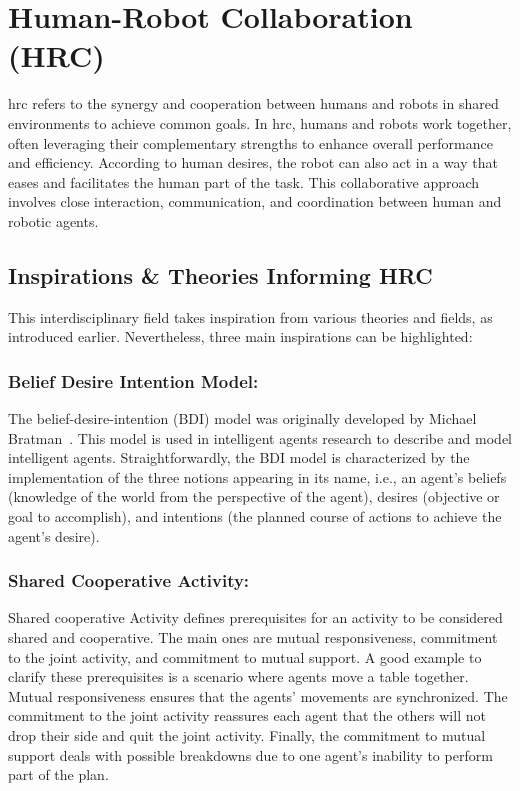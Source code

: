 \section{Human-Robot Collaboration (HRC)}

\acrfull{hrc} refers to the synergy and cooperation between humans and robots in shared environments to achieve common goals. In \acrshort{hrc}, humans and robots work together, often leveraging their complementary strengths to enhance overall performance and efficiency. According to human desires, the robot can also act in a way that eases and facilitates the human part of the task. This collaborative approach involves close interaction, communication, and coordination between human and robotic agents.

\subsection{Inspirations \& Theories Informing HRC}

This interdisciplinary field takes inspiration from various theories and fields, as introduced earlier. Nevertheless, three main inspirations can be highlighted:

\subsubsection*{Belief Desire Intention Model:} The belief-desire-intention (BDI) model was originally developed by Michael Bratman~\cite{Bratman1987_BRAIPA}. This model is used in intelligent agents research to describe and model intelligent agents. Straightforwardly, the BDI model is characterized by the implementation of the three notions appearing in its name, i.e., an agent's beliefs (knowledge of the world from the perspective of the agent), desires (objective or goal to accomplish), and intentions (the planned course of actions to achieve the agent's desire). 

\subsubsection*{Shared Cooperative Activity:} Shared cooperative Activity defines prerequisites for an activity to be considered shared and cooperative. The main ones are mutual responsiveness, commitment to the joint activity, and commitment to mutual support. A good example to clarify these prerequisites is a scenario where agents move a table together. Mutual responsiveness ensures that the agents' movements are synchronized. The commitment to the joint activity reassures each agent that the others will not drop their side and quit the joint activity. Finally, the commitment to mutual support deals with possible breakdowns due to one agent's inability to perform part of the plan.  

